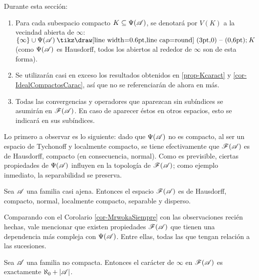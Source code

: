  \begin{consideracion}
  Durante esta sección:
  \begin{enumerate}
   \item Para cada subespacio compacto $K \subseteq \Psi(\mathscr{A})$, se denotará por $V(K)$ a la vecindad abierta de $\infty$: $\{\infty\} \cup \Psi(\ms{A}) \setminus K$ (como $\Psi(\mathscr{A})$ es Hausdorff, todos los abiertos al rededor de $\infty$ son de esta forma).
   \item Se utilizarán casi en exceso los resultados obtenidos en \ref{prop-Kcaract} y \ref{cor-IdealCompactosCarac}, así que no se referenciarán de ahora en más.
   \item Todas las convergencias y operadores que aparezcan sin subíndices se asumirán en $\mathscr{F}(\mathscr{A})$. En caso de aparecer éstos en otros espacios, esto se indicará en sus subíndices.
  \end{enumerate}
 \end{consideracion}

 Lo primero a observar es lo siguiente: dado que $\Psi(\mathscr{A})$ no es compacto, al ser un espacio de Tychonoff y localmente compacto, se tiene efectivamente que $\mathscr{F}(\mathscr{A})$ es de Hausdorff, compacto (en consecuencia, normal). Como es previsible, ciertas propiedades de $\Psi(\mathscr{A})$ influyen en la topología de $\mathscr{F}(\mathscr{A})$; como ejemplo inmediato, la separabilidad se preserva.

 \begin{observacion}
  Sea $\mathscr{A}$ una familia casi ajena. Entonces el espacio $\mathscr{F}(\mathscr{A})$ es de Hausdorff, compacto, normal, localmente compacto, separable y disperso.
 \end{observacion}

 Comparando con el Corolario \ref{cor-MrwokaSiempre} con las observaciones recién hechas, vale mencionar que existen propiedades $\mathscr{F}(\mathscr{A})$ que tienen una dependencia más compleja con $\Psi(\mathscr{A})$. Entre ellas, todas las que tengan relación a las sucesiones.

 \begin{proposicion}\label{prop-caracterFrechet}
  Sea $\mathscr{A}$ una familia no compacta. Entonces el carácter de $\infty$ en $\mathscr{F}(\mathscr{A})$ es exactamente $\aleph_0 + |\mathscr{A}|$.
 \end{proposicion}

